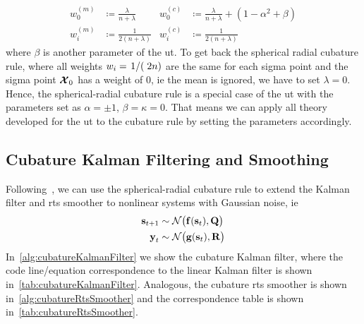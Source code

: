 		\begin{align*}
			w_0^{(m)} &\coloneqq \frac{\lambda}{n + \lambda} & w_0^{(c)} &\coloneqq \frac{\lambda}{n + \lambda} + (1 - \alpha^2 + \beta) \\
			w_i^{(m)} &\coloneqq \frac{1}{2(n + \lambda)}    & w_i^{(c)} &\coloneqq \frac{1}{2(n + \lambda)}
		\end{align*}
		where \(\beta\) is another parameter of the \ac{ut}. To get back the spherical radial cubature rule, where all weights \( w_i = \flatfrac{1}(2n) \) are the same for each sigma point and the sigma point \( \boldsymbol{\mathrm{\mathcal{X}}}_0 \) has a weight of \(0\), \ac{ie} the mean is ignored, we have to set \( \lambda = 0 \). Hence, the spherical-radial cubature rule is a special case of the \ac{ut} with the parameters set as \( \alpha = \pm 1 \), \( \beta = \kappa = 0 \). That means we can apply all theory developed for the \ac{ut} to the cubature rule by setting the parameters accordingly.

	\subsection{Cubature Kalman Filtering and Smoothing}
		\label{subsec:cubatureFiltering}

		Following~\cite{deisenrothProbabilisticPerspectiveGaussian2011,solinCubatureIntegrationMethods2010}, we can use the spherical-radial cubature rule to extend the Kalman filter and \ac{rts} smoother to nonlinear systems with Gaussian noise, \ac{ie}
		\begin{align*}
			\boldsymbol{\mathrm{s}}_{t + 1} &\sim \mathcal{N}\big( \boldsymbol{\mathrm{f}}(\boldsymbol{\mathrm{s}}_t), \boldsymbol{\mathrm{Q}} \big) \\
			\boldsymbol{\mathrm{y}}_t &\sim \mathcal{N}\big( \boldsymbol{\mathrm{g}}(\boldsymbol{\mathrm{s}}_t), \boldsymbol{\mathrm{R}} \big)
		\end{align*}
		In~\autoref{alg:cubatureKalmanFilter} we show the cubature Kalman filter, where the code line/equation correspondence to the linear Kalman filter is shown in~\autoref{tab:cubatureKalmanFilter}. Analogous, the cubature \ac{rts} smoother is shown in~\autoref{alg:cubatureRtsSmoother} and the correspondence table is shown in~\autoref{tab:cubatureRtsSmoother}.

